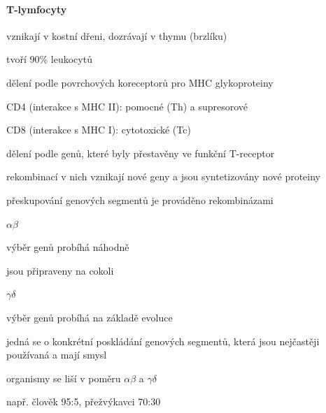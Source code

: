 \documentclass[DIV=8]{scrreprt}
\begin{document}
\paragraph{T-lymfocyty}
\begin{myItemize}[nosep]
    \item vznikají v kostní dřeni, dozrávají v thymu (brzlíku)
    \item tvoří 90\% leukocytů
    \item dělení podle povrchových koreceptorů pro MHC glykoproteiny
\begin{myItemize}[nosep]
    \item CD4 (interakce s MHC II): pomocné (Th) a supresorové
    \item CD8 (interakce s MHC I): cytotoxické (Tc)
\end{myItemize}

    \item dělení podle genů, které byly přestavěny ve funkční T-receptor
\begin{myItemize}[nosep]
    \item rekombinací v nich vznikají nové geny a jsou syntetizovány nové proteiny
\begin{myItemize}[nosep]
    \item přeskupování genových segmentů je prováděno rekombinázami
\end{myItemize}

    \item \(\alpha\)\(\beta\)
\begin{myItemize}[nosep]
    \item výběr genů probíhá náhodně
    \item jsou připraveny na cokoli
\end{myItemize}

    \item \(\gamma \delta\)
\begin{myItemize}[nosep]
    \item výběr genů probíhá na základě evoluce
    \item jedná se o konkrétní poskládání genových segmentů, která jsou nejčastěji používaná a mají smysl
\end{myItemize}

    \item organismy se liší v poměru \(\alpha\)\(\beta\) a \(\gamma \delta\)
\begin{myItemize}[nosep]
    \item např. člověk 95:5, přežvýkavci 70:30
\end{myItemize}

\end{myItemize}

\end{myItemize}
\end{document}
